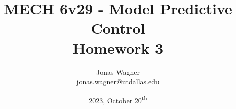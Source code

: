 \documentclass[]{article}
\title{
    MECH 6v29 - Model Predictive Control\\ 
    Homework 3
}
\author{Jonas Wagner\\ jonas.wagner@utdallas.edu}
\date{2023, October 20\textsuperscript{th}}
\begin{document}
\maketitle

\tableofcontents

\newpage
\section{}

\subsection{}







\end{document}

